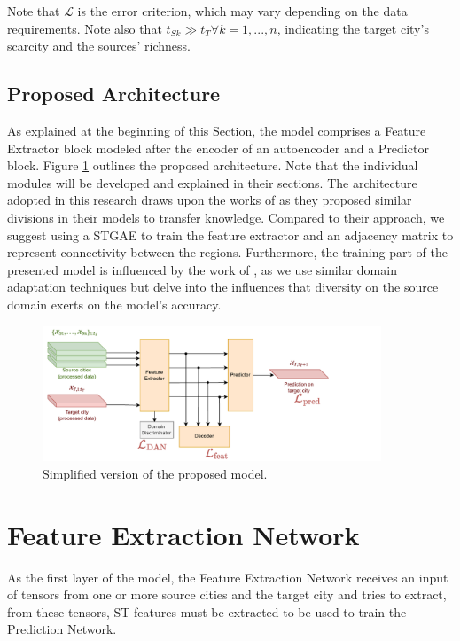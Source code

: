 Note that $ \mathcal{L}$ is the error criterion, which may vary depending on the data requirements. Note also that $t_{Sk} \gg t_T \forall k=1, ..., n$, indicating the target city's scarcity and the sources' richness.

\subsection{Proposed Architecture}

As explained at the beginning of this Section, the model comprises a Feature Extractor block modeled after the encoder of an autoencoder and a Predictor block. Figure \ref{fig:network_simplified} outlines the proposed architecture. Note that the individual modules will be developed and explained in their sections. The architecture adopted in this research draws upon the works of \cite{Wang202222, Wang20224695} as they proposed similar divisions in their models to transfer knowledge. Compared to their approach, we suggest using a \gls{STGAE} to train the feature extractor and an adjacency matrix to represent connectivity between the regions. Furthermore, the training part of the presented model is influenced by the work of \cite{Tang2022}, as we use similar domain adaptation techniques but delve into the influences that diversity on the source domain exerts on the model's accuracy.

\begin{figure}[!ht]
\noindent\hspace{0.5mm}\includegraphics[width=0.9\textwidth]{./figures/Model.pdf}
\caption{Simplified version of the proposed model.}
\label{fig:network_simplified}
\end{figure}

\section{Feature Extraction Network} \label{sec:fen}

As the first layer of the model, the Feature Extraction Network receives an input of tensors from one or more source cities and the target city and tries to extract, from these tensors, \gls{ST} features must be extracted to be used to train the Prediction Network. 

